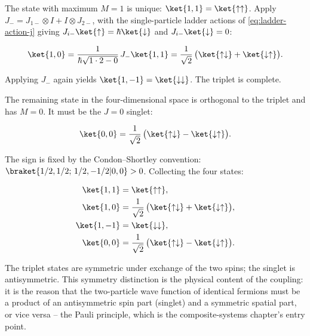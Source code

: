 The state with maximum $M = 1$ is unique: $\ket{1,1} = \ket{\uparrow\uparrow}$. Apply $J_- = J_{1-} \otimes I + I \otimes J_{2-}$, with the single-particle ladder actions of \eqref{eq:ladder-action-j} giving $J_{i-}\ket{\uparrow} = \hbar\ket{\downarrow}$ and $J_{i-}\ket{\downarrow} = 0$:
\begin{linenomath}
  \begin{equation}
    \ket{1,0}
    = \frac{1}{\hbar\sqrt{1\cdot2 - 0}}
      \,J_-\ket{1,1}
    = \frac{1}{\sqrt{2}}\,
      \bigl(\ket{\uparrow\downarrow} + \ket{\downarrow\uparrow}\bigr).
  \end{equation}
\end{linenomath}
Applying $J_-$ again yields $\ket{1,-1} = \ket{\downarrow\downarrow}$. The triplet is complete.

The remaining state in the four-dimensional space is orthogonal to the triplet and has $M = 0$. It must be the $J = 0$ singlet:
\begin{linenomath}
  \begin{equation}
    \ket{0,0} = \frac{1}{\sqrt{2}}\,
      \bigl(\ket{\uparrow\downarrow} - \ket{\downarrow\uparrow}\bigr).
  \end{equation}
\end{linenomath}
The sign is fixed by the Condon--Shortley convention: $\braket{1/2,1/2;\,1/2,-1/2|0,0} > 0$. Collecting the four states:
\begin{linenomath}
  \begin{equation}
    \begin{aligned}
      \ket{1,1}   &= \ket{\uparrow\uparrow}, \\
      \ket{1,0}   &= \frac{1}{\sqrt{2}}\,
                       \bigl(\ket{\uparrow\downarrow}
                       + \ket{\downarrow\uparrow}\bigr), \\
      \ket{1,-1}  &= \ket{\downarrow\downarrow}, \\
      \ket{0,0}   &= \frac{1}{\sqrt{2}}\,
                       \bigl(\ket{\uparrow\downarrow}
                       - \ket{\downarrow\uparrow}\bigr).
    \end{aligned}
    \label{eq:singlet-triplet}
  \end{equation}
\end{linenomath}
The triplet states are symmetric under exchange of the two spins; the singlet is antisymmetric. This symmetry distinction is the physical content of the coupling: it is the reason that the two-particle wave function of identical fermions must be a product of an antisymmetric spin part (singlet) and a symmetric spatial part, or vice versa -- the Pauli principle, which is the composite-systems chapter's entry point.

